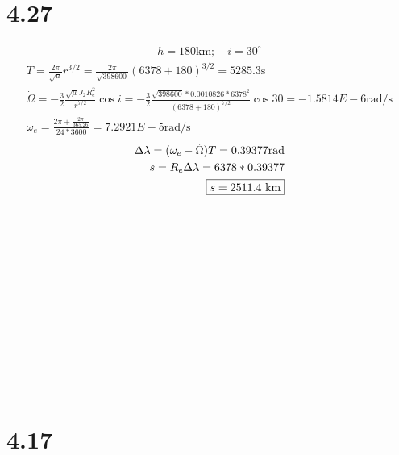 \documentclass[12 pt]{article}
\begin{document}
\section*{4.27}
\begin{align*}
    h=180\textrm{km};\quad i=30^{\circ}
\end{align*}
\begin{align*}
    T=\frac{2\pi}{\sqrt{\mu}}r^{3/2}=\frac{2\pi}{\sqrt{398600}}(6378+180)^{3/2}=5285.3\textrm{s} \\
    \dot{\Omega}=-\frac{3}{2}\frac{\sqrt{\mu}J_2R_e^2}{r^{7/2}}\cos{i}=
    -\frac{3}{2}\frac{\sqrt{398600}*0.0010826*6378^2}{(6378+180)^{7/2}}\cos{30}=-1.5814E-6 \textrm{rad/s} \\
    \omega_e=\frac{2\pi+\frac{2\pi}{365.26}}{24*3600}=7.2921E-5\textrm{rad/s}
\end{align*}
\begin{align*}
    \Delta\lambda=(\omega_e-\dot{\Omega})T=0.39377\textrm{rad} \\
    s=R_e\Delta\lambda=6378*0.39377 \\
    \fbox{$s=2511.4$ km}
\end{align*} \\ \\ \\ \\ \\ \\ \\ \\ \\ \\ \\ \\
\section*{4.17}
\end{document}
